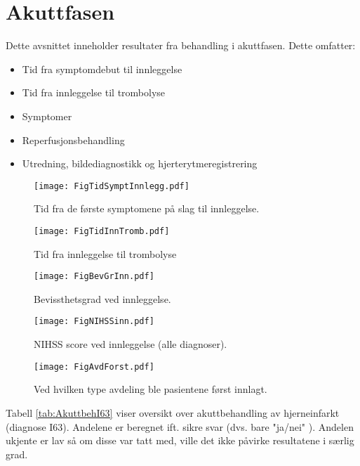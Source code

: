 \documentclass [norsk,a4paper,twoside]{article}\usepackage[]{graphicx}\usepackage[]{color}
\begin{document}
\clearpage
\section{Akuttfasen}

Dette avsnittet inneholder resultater fra behandling i akuttfasen. Dette omfatter:
\begin{itemize}
	\item Tid fra symptomdebut til innleggelse
	\item Tid fra innleggelse til trombolyse
	\item Symptomer
	\item Reperfusjonsbehandling
	\item Utredning, bildediagnostikk og hjerterytmeregistrering
\end{itemize}




\begin{figure}[ht]
\centering \texttt{[image: FigTidSymptInnlegg.pdf]}
\caption{\label{fig:TidSymptInnlegg} Tid fra de første symptomene på slag til innleggelse.}
\end{figure}

\begin{figure}[ht]
\centering \texttt{[image: FigTidInnTromb.pdf]}
\caption{\label{fig:TidInnTromb}Tid fra innleggelse til trombolyse}
\end{figure}

\begin{figure}[ht]
\centering \texttt{[image: FigBevGrInn.pdf]}
\caption{\label{fig:BevissthetsgradInn} Bevissthetsgrad ved innleggelse.}
\end{figure}

\begin{figure}[ht]
\centering \texttt{[image: FigNIHSSinn.pdf]}
\caption{\label{fig:NIHSSinnkomst} NIHSS score ved innleggelse (alle diagnoser).}
\end{figure}

\begin{figure}[ht]
\centering \texttt{[image: FigAvdForst.pdf]}
\caption{\label{fig:AvdForstInnlagt} Ved hvilken type avdeling ble pasientene først innlagt.}
\end{figure}


Tabell \ref{tab:AkuttbehI63} viser oversikt over akuttbehandling av hjerneinfarkt (diagnose I63).
Andelene er beregnet ift. sikre svar (dvs. bare "ja/nei" ).
Andelen ukjente er lav så om disse var tatt med, ville det ikke påvirke resultatene i særlig grad.
\end{document}
